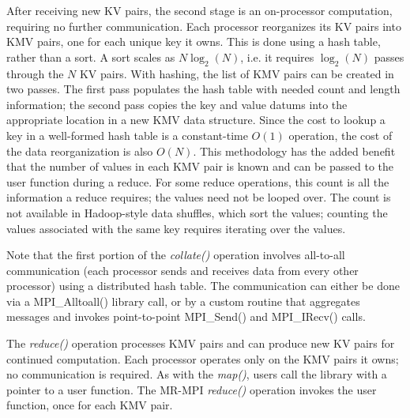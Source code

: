 After receiving new KV pairs, the second stage is an on-processor
computation, requiring no further communication.  Each processor
reorganizes its KV pairs into KMV pairs, one for each unique key it
owns.  This is done using a hash table, rather than a sort.  A sort
scales as $N\log_2(N)$, i.e. it requires $\log_2(N)$ passes through
the $N$ KV pairs.  With hashing, the list of KMV pairs can be created
in two passes.  The first pass populates the hash table with needed
count and length information; the second pass copies the key and value
datums into the appropriate location in a new KMV data structure.
Since the cost to lookup a key in a well-formed hash table is a
constant-time $O(1)$ operation, the cost of the data reorganization is
also $O(N)$.  This methodology has the added benefit that the number
of values in each KMV pair is known and can be passed to the user
function during a reduce.  For some reduce operations, this count is
all the information a reduce requires; the values need not be looped
over.  The count is not available in Hadoop-style data shuffles, which
sort the values; counting the values associated with the same key
requires iterating over the values.

Note that the first portion of the {\it collate()} operation involves
all-to-all communication (each processor sends and receives data from
every other processor) using a distributed hash table.  The
communication can either be done via a MPI\_Alltoall() library call,
or by a custom routine that aggregates messages and invokes
point-to-point MPI\_Send() and MPI\_IRecv() calls.

The {\it reduce()} operation processes KMV pairs and can produce new
KV pairs for continued computation.  Each processor operates only on
the KMV pairs it owns; no communication is required.  As with the {\it
map()}, users call the library with a pointer to a user function.  The
MR-MPI {\it reduce()} operation invokes the user function, once for
each KMV pair.

